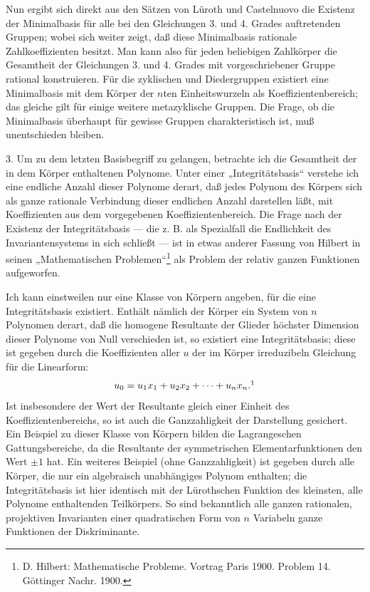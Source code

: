 \documentclass[11pt]{article}
\begin{document}
Nun ergibt sich direkt aus den Sätzen von Lüroth und Castelnuovo die Existenz der Minimalbasis für alle bei den Gleichungen 3. und 4. Grades auftretenden Gruppen; wobei sich weiter zeigt, daß diese Minimalbasis rationale Zahlkoeffizienten besitzt. Man kann also für jeden beliebigen Zahlkörper die Gesamtheit der Gleichungen 3. und 4. Grades mit vorgeschriebener Gruppe rational konstruieren. Für die zyklischen und Diedergruppen existiert eine Minimalbasis mit dem Körper der $n$ten Einheitswurzeln als Koeffizientenbereich; das gleiche gilt für einige weitere metazyklische Gruppen. Die Frage, ob die Minimalbasis überhaupt für gewisse Gruppen charakteristisch ist, muß unentschieden bleiben.

3. Um zu dem letzten Basisbegriff zu gelangen, betrachte ich die Gesamtheit der in dem Körper enthaltenen Polynome. Unter einer „Integritätsbasis“ verstehe ich eine endliche Anzahl dieser Polynome derart, daß jedes Polynom des Körpers sich als ganze rationale Verbindung dieser endlichen Anzahl darstellen läßt, mit Koeffizienten aus dem vorgegebenen Koeffizientenbereich. Die Frage nach der Existenz der Integritätsbasis --- die z. B. als Spezialfall die Endlichkeit des Invariantensystems in sich schließt --- ist in etwas anderer Fassung von Hilbert in seinen „Mathematischen Problemen“\footnote{D. Hilbert: Mathematische Probleme. Vortrag Paris 1900. Problem 14. Göttinger Nachr. 1900.} als Problem der relativ ganzen Funktionen aufgeworfen.

Ich kann einstweilen nur eine Klasse von Körpern angeben, für die eine Integritätsbasis existiert. Enthält nämlich der Körper ein System von $n$ Polynomen derart, daß die homogene Resultante der Glieder höchster Dimension dieser Polynome von Null verschieden ist, so existiert eine Integritätsbasis; diese ist gegeben durch die Koeffizienten aller $u$ der im Körper irreduzibeln Gleichung für die Linearform:
\[
  u_0=u_1x_1+u_2x_2+\cdots+u_nx_n.\footnotemark
\]
Ist insbesondere der Wert der Resultante gleich einer Einheit des Koeffizientenbereichs, so ist auch die Ganzzahligkeit der Darstellung gesichert. Ein Beispiel zu dieser Klasse von Körpern bilden die Lagrangeschen Gattungsbereiche, da die Resultante der symmetrischen Elementarfunktionen den Wert $\pm 1$ hat. Ein weiteres Beispiel (ohne Ganzzahligkeit) ist gegeben durch alle Körper, die nur ein algebraisch unabhängiges Polynom enthalten; die Integritätsbasis ist hier identisch mit der Lürothschen Funktion des kleinsten, alle Polynome enthaltenden Teilkörpers. So sind bekanntlich alle ganzen rationalen, projektiven Invarianten einer quadratischen Form von $n$ Variabeln ganze Funktionen der Diskriminante.
\end{document}
